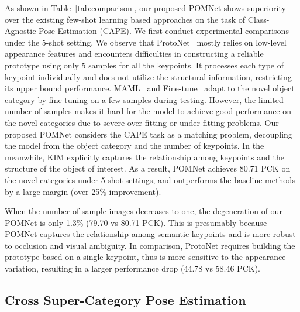 \documentclass[runningheads]{llncs}
\begin{document}
As shown in Table~\ref{tab:comparison}, our proposed POMNet shows superiority over the existing few-shot learning based approaches on the task of Class-Agnostic Pose Estimation (CAPE). We first conduct experimental comparisons under the 5-shot setting. 
We observe that ProtoNet~\cite{snell2017prototypical} mostly relies on low-level appearance features and encounters difficulties in constructing a reliable prototype using only 5 samples for all the keypoints. It processes each type of keypoint individually and does not utilize the structural information, restricting its upper bound performance.
MAML~\cite{finn2017model} and Fine-tune~\cite{nakamura2019revisiting} adapt to the novel object category by fine-tuning on a few samples during testing. However, the limited number of samples makes it hard for the model to achieve good performance on the novel categories due to severe over-fitting or under-fitting problems.
Our proposed POMNet considers the CAPE task as a matching problem, decoupling the model from the object category and the number of keypoints. In the meanwhile, KIM explicitly captures the relationship among keypoints and the structure of the object of interest. As a result, POMNet achieves 80.71 PCK on the novel categories under 5-shot settings, and outperforms the baseline methods by a large margin (over 25\% improvement). 

When the number of sample images decreases to one, the degeneration of our POMNet is only 1.3\% (79.70 vs 80.71 PCK). This is presumably because POMNet captures the relationship among semantic keypoints and is more robust to occlusion and visual ambiguity. In comparison, ProtoNet requires building the prototype based on a single keypoint, thus is more sensitive to the appearance variation, resulting in a larger performance drop (44.78 vs 58.46 PCK). 


\subsection{Cross Super-Category Pose Estimation}

\begin{table*}[t]
    \setlength\tabcolsep{6pt}
	\caption{Cross super-category evaluation (PCK). POMNet outperforms other methods. But there is still large room for improvement on the rare categories.}
	\label{tab:cross-category}
	\begin{center}
	\end{center}
\end{table*}
\end{document}
